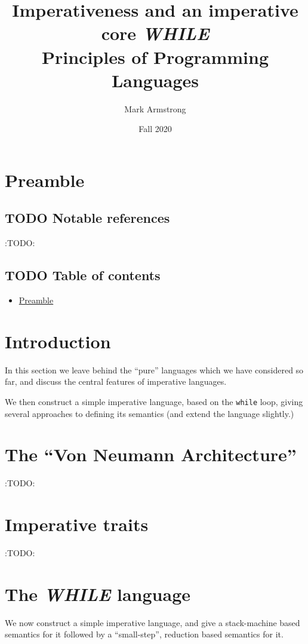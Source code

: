 \documentclass[11pt]{article}
\author{Mark Armstrong}
\date{Fall 2020}
\title{Imperativeness and an imperative core \emph{WHILE}\\\medskip
\large Principles of Programming Languages}
\theoremstyle{definition}
\begin{document}
\maketitle

\section{Preamble}
\label{sec:orged3510b}
\subsection{{\bfseries\sffamily TODO} Notable references}
\label{sec:orgb8689bc}
:TODO:

\subsection{{\bfseries\sffamily TODO} Table of contents}
\label{sec:orgeddbb05}
\begin{scriptsize}
\begin{itemize}
\item \hyperref[sec:orged3510b]{Preamble}
\end{itemize}
\end{scriptsize}

\section{Introduction}
\label{sec:org6581f99}
In this section we leave behind the “pure” languages
which we have considered so far, and discuss the central features
of imperative languages.

We then construct a simple imperative language,
based on the \texttt{while} loop,
giving several approaches to defining its semantics
(and extend the language slightly.)

\section{The “Von Neumann Architecture”}
\label{sec:org529b2db}
:TODO:

\section{Imperative traits}
\label{sec:org87f99dd}
:TODO:

\section{The \emph{WHILE} language}
\label{sec:org9936eda}
We now construct a simple imperative language,
and give a stack-machine based semantics for it
followed by a “small-step”, reduction based semantics for it.
\end{document}
